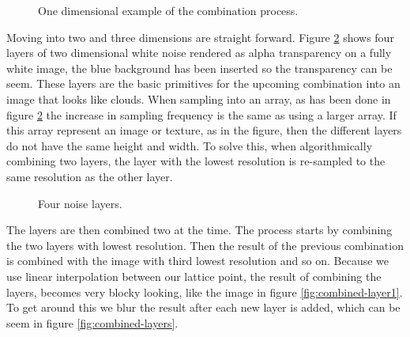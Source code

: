 \begin{figure}[!h]
  \centering
  \subfloat[Layer 0.]{
    \texttt{[image: n0]}
    \label{fig:1d-layer0}
  }
  \hspace{4mm}
  \subfloat[Layer 1.]{
    \texttt{[image: n1]}
    \label{fig:1d-layer1}
  }
  \newline
  \centering
  \subfloat[Layer 2.]{
    \texttt{[image: n2]}
    \label{fig:1d-layer2}
  }
  \hspace{4mm}
  \subfloat[Result.]{
    \texttt{[image: n0to2]}
    \label{fig:1d-result}
  }
  \caption{One dimensional example of the combination process.}
  \label{fig:1d-layers}
\end{figure}

Moving into two and three dimensions are straight forward. Figure
\ref{fig:noise-layers} shows four layers of two dimensional white
noise rendered as alpha transparency on a fully white image, the blue
background has been inserted so the transparency can be seem. These
layers are the basic primitives for the upcoming combination into an
image that looks like clouds.
%
When sampling into an array, as has been done in figure
\ref{fig:noise-layers} the increase in sampling frequency is the same
as using a larger array. If this array represent an image or texture,
as in the figure, then the different layers do not have the same
height and width. To solve this, when algorithmically combining two
layers, the layer with the lowest resolution is re-sampled to the same
resolution as the other layer.

\begin{figure}[!h]
    \centering
  \hspace{4mm}
  \hspace{4mm}
  \hspace{4mm}
  \caption{Four noise layers.}
  \label{fig:noise-layers}
\end{figure}

The layers are then combined two at the time. The process starts by
combining the two layers with lowest resolution. Then the result of
the previous combination is combined with the image with third lowest
resolution and so on.
%
Because we use linear interpolation between our lattice point, the
result of combining the layers, becomes very blocky looking, like the
image in figure \ref{fig:combined-layer1}. To get
around this we blur the result after each new layer is added, which
can be seem in figure \ref{fig:combined-layers}.

